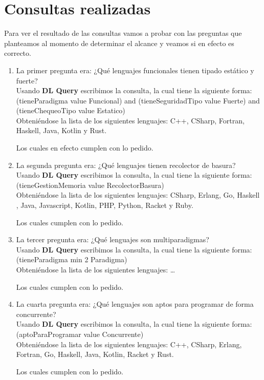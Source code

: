 \documentclass[12pt, titlepage, a4paper]{article}
\begin{document}
\section{Consultas realizadas}
Para ver el resultado de las consultas vamos a probar con las 
preguntas que planteamos al momento de determinar el alcance y 
veamos si en efecto es correcto.
\begin{enumerate}
    \item {La primer pregunta era: 
        ¿Qué lenguajes funcionales tienen tipado estático y fuerte?\\
        
        Usando \textbf{DL Query} escribimos la consulta, la cual tiene 
        la siguiente forma: (tieneParadigma value Funcional) and 
        (tieneSeguridadTipo value Fuerte) and 
        (tieneChequeoTipo value Estatico)\\

        Obteniéndose la lista de los siguientes lenguajes: C++, CSharp, 
        Fortran, Haskell, Java, Kotlin y Rust.

        Los cuales en efecto cumplen con lo pedido.
        }
    \item {La segunda pregunta era:
        ¿Qué lenguajes tienen recolector de basura?\\
        
        Usando \textbf{DL Query} escribimos la consulta, la cual tiene 
        la siguiente forma: (tieneGestionMemoria value RecolectorBasura)\\

        Obteniéndose la lista de los siguientes lenguajes: CSharp, Erlang, Go, Haskell
        , Java, Javascript, Kotlin, PHP, Python, Racket y Ruby.

        Los cuales cumplen con lo pedido.
        }
    
    \item {La tercer pregunta era:
        ¿Qué lenguajes son multiparadigmas?\\
        
        Usando \textbf{DL Query} escribimos la consulta, la cual tiene 
        la siguiente forma: (tieneParadigma min 2 Paradigma)\\

        Obteniéndose la lista de los siguientes lenguajes: \dots

        Los cuales cumplen con lo pedido.
        }
    
    \item {La cuarta pregunta era:
        ¿Qué lenguajes son aptos para programar de forma concurrente?\\
        
        Usando \textbf{DL Query} escribimos la consulta, la cual tiene 
        la siguiente forma: (aptoParaProgramar value Concurrente)\\

        Obteniéndose la lista de los siguientes lenguajes: C++, CSharp, Erlang, Fortran, Go, Haskell, 
        Java, Kotlin, Racket y Rust.

        Los cuales cumplen con lo pedido.
        }
\end{enumerate}
\end{document}
